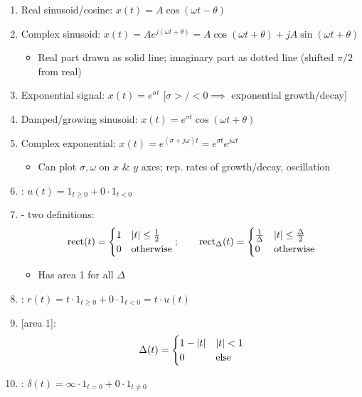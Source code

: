 \documentclass[12pt]{extarticle}
\begin{document}
\begin{whitebox}
    \begin{enumerate}
        \item Real sinusoid/cosine: $x(t)=A\cos(\omega t-\theta)$
        \item Complex sinusoid: $x(t)=Ae^{j(\omega t+\theta)}=A\cos(\omega t+\theta)+jA\sin(\omega t+\theta)$ \begin{itemize}
            \item Real part drawn as solid line; imaginary part as dotted line (shifted $\pi/2$ from real)
        \end{itemize}
        \item Exponential signal: $x(t)=e^{\sigma t}$ [$\sigma>/<0\implies$ exponential growth/decay]
        \item Damped/growing sinusoid: $x(t)=e^{\sigma t}\cos(\omega t+\theta)$
        \item Complex exponential: $x(t)=e^{(\sigma+j\omega)t}=e^{\sigma t}e^{j\omega t}$ \begin{itemize}
            \item Can plot $\sigma,\omega$ on $x$ \& $y$ axes; rep. rates of growth/decay, oscillation
        \end{itemize}
        \item {}: $u(t)=1_{t\geq0}+0\cdot1_{t<0}$ 
        \item {} - two definitions: \begin{align*}
            \text{rect}(t)=\begin{cases}
                1 & \left|t\right|\leq\frac{1}{2} \\ 0 & \text{otherwise}
            \end{cases};\qquad\text{rect}_{\Delta}(t)=\begin{cases}
                \frac{1}{\Delta} & \left|t\right|\leq\frac{\Delta}{2} \\ 0 & \text{otherwise}
            \end{cases}
        \end{align*} \begin{itemize}
            \item Has area 1 for all $\Delta$
        \end{itemize}
        \item {}: $r(t)=t\cdot 1_{t\geq0}+0\cdot1_{t<0}=t\cdot u(t)$
        \item {} [area 1]: \begin{align*}
            \Delta(t)=\begin{cases}
                1-\left|t\right| & \left|t\right|<1 \\ 0 & \text{else}
            \end{cases}
        \end{align*}
        \item {}: $\delta(t)=\infty\cdot 1_{t=0}+0\cdot1_{t\neq0}$
    \end{enumerate}
\end{whitebox}
\end{document}
